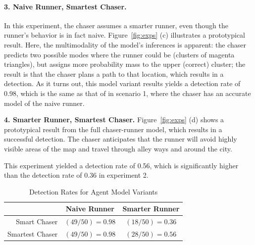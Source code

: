 \documentclass{article}
\begin{document}
\paragraph{3. Naive Runner, Smartest Chaser.} In this experiment, the chaser assumes a smarter runner, even though the runner's behavior is in fact naive.  Figure~\ref{fig:exps} (c) illustrates a prototypical result. Here, the multimodality of the model's inferences is apparent: the chaser predicts two possible modes where the runner could be (clusters of magenta triangles), but assigns more probability mass to the upper (correct) cluster; the result is that the chaser plans a path to that location, which results in a detection. As it turns out, this model variant results yields a detection rate of 0.98, which is the same as that of in scenario 1, where the chaser has an accurate model of the naive runner.

\textbf{4. Smarter Runner, Smartest Chaser.} Figure~\ref{fig:exps} (d) shows a prototypical result from the full chaser-runner model, which results in a successful detection. The chaser anticipates that the runner will avoid highly visible areas of the map and travel through alley ways and around the city. 

This experiment yielded a detection rate of 0.56, which is significantly higher than the detection rate of 0.36 in experiment 2. %

\begin{table}[!t]
\centering
\begin{tabular}{r|cc}
    \toprule
    & Naive Runner & Smarter Runner \\
    \midrule
    Smart Chaser & $(49/50)=0.98$ & $(18/50)=0.36$ \\
    Smartest Chaser & $(49/50)=0.98$ & $(28/50)=0.56$ \\
    \bottomrule
\end{tabular}
\caption{Detection Rates for Agent Model Variants}
\label{table:detect_rates}
\end{table}

\end{document}
